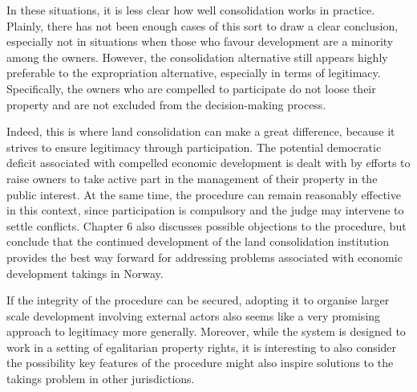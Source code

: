 In these situations, it is less clear how well consolidation works in practice. Plainly, there has not been enough cases of this sort to draw a clear conclusion, especially not in situations when those who favour development are a minority among the owners. However, the consolidation alternative still appears highly preferable to the expropriation alternative, especially in terms of legitimacy. Specifically, the owners who are compelled to participate do not loose their property and are not excluded from the decision-making process.

Indeed, this is where land consolidation can make a great difference, because it strives to ensure legitimacy through participation. The potential democratic deficit associated with compelled economic development is dealt with by efforts to raise owners to take active part in the management of their property in the public interest. At the same time, the procedure can remain reasonably effective in this context, since participation is compulsory and the judge may intervene to settle conflicts. Chapter 6 also discusses possible objections to the procedure, but conclude that the continued development of the land consolidation institution provides the best way forward for addressing problems associated with economic development takings in Norway.


If the integrity of the procedure can be secured, adopting it to organise larger scale development involving external actors also seems like a very promising approach to legitimacy more generally. Moreover, while the system is designed to work in a setting of egalitarian property rights, it is interesting to also consider the possibility key features of the procedure might also inspire solutions to the takings problem in other jurisdictions. %

